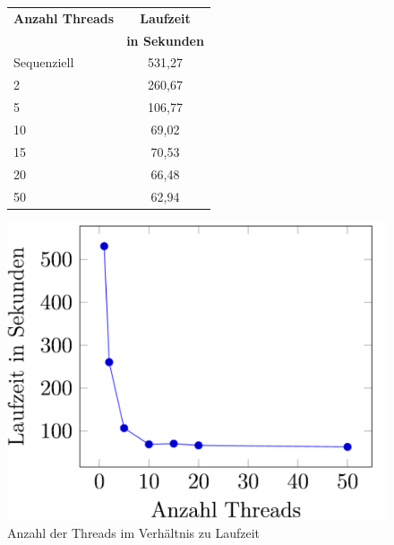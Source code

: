 \begin{figure}[!hbt]
	\begin{minipage}[!hbt]{5cm}
		\centering
		
		\begin{tabular}{ l  c }
			\toprule
			\textbf{Anzahl Threads} & \textbf{Laufzeit}\\
			& \textbf{in Sekunden}\\
			\midrule
			Sequenziell             & 531,27 \\
			2                       & 260,67 \\
			5                       & 106,77 \\
			10                      & 69,02 \\
			15                      & 70,53 \\
			20                      & 66,48 \\
			50                      & 62,94 \\
			\bottomrule
		\end{tabular}
		
	\end{minipage}
	\hfill
	\begin{minipage}[!hbt]{8.2cm}
		\centering
	
		
			\includegraphics[scale=0.6]{images/laufzeiten}			 
		
	\end{minipage}
	\caption{Anzahl der Threads im Verhältnis zu Laufzeit}\label{fig.laufzeitListe}
\end{figure}



\listoffigures
\lstlistoflistings
\listoftables





